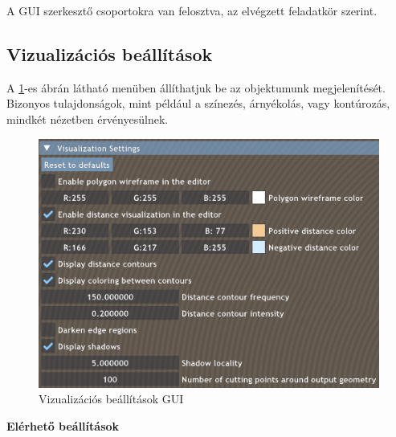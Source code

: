 A GUI szerkesztő csoportokra van felosztva, az elvégzett feladatkör szerint.


\subsection{Vizualizációs beállítások}

A \ref{fig:visualization_settings-1}-es ábrán látható menüben állíthatjuk be az objektumunk megjelenítését. Bizonyos tulajdonságok, mint például a színezés, árnyékolás, vagy kontúrozás, mindkét nézetben érvényesülnek.

\begin{figure}[H]
    \centering
    \includegraphics[width=0.8\linewidth]{images/visualization_settings.png}
    \caption{Vizualizációs beállítások GUI}
    \label{fig:visualization_settings-1}
\end{figure}

\textbf{Elérhető beállítások}

